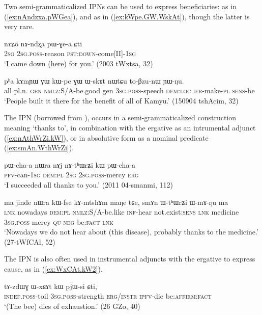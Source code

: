 Two semi-grammaticalized IPNs can be used to express beneficiaries:  as in (\ref{ex:nAndzxa.pWGea}), and  as in (\ref{ex:kWpe.GW.WskAt}), though the latter is very rare.

\begin{exe}
\ex \label{ex:nAndzxa.pWGea}
\gll nɤʑo nɤ-ndʐa pɯ-ɣe-a ɕti \\
\textsc{2sg} \textsc{2sg}.\textsc{poss}-reason \textsc{pst}:\textsc{down}-come[II]-\textsc{1sg} \\
\glt `I came down (here) for you.' (2003 tWxtsa, 32)
\end{exe}

\begin{exe}
\ex \label{ex:kWpe.GW.WskAt}
\gll pʰa kɤmɲɯ ɣɯ kɯ-pe ɣɯ ɯ-skɤt nɯtɕu to-βzu-nɯ ɲɯ-ŋu. \\
all pl.n. \textsc{gen} \textsc{nmlz}:S/A-be.good gen \textsc{3sg}.\textsc{poss}-speech \textsc{dem}:\textsc{loc} \textsc{ifr}-make-\textsc{pl} \textsc{sens}-be \\
\glt `People built it there for the benefit of all of Kamyu.' (150904 tshAcim, 32)
\end{exe}

The IPN  (borrowed from ), occurs in a semi-grammaticalized construction meaning `thanks to', in combination with the ergative  as an intrumental adjunct (\ref{ex:nAthWrZi.kW}), or in absolutive form as a nominal predicate (\ref{ex:smAn.WthWrZi}).

  \begin{exe}
\ex \label{ex:nAthWrZi.kW}
\gll pɯ-cha-a nɯra nɤj nɤ-tʰɯrʑi kɯ pɯ-cha-a \\
\textsc{pfv}-can-\textsc{1sg} \textsc{dem}:\textsc{pl} \textsc{2sg} \textsc{2sg}.\textsc{poss}-mercy \textsc{erg}  \\
\glt `I succeeded all thanks to you.' (2011 04-smanmi, 112)
  \end{exe}

  \begin{exe}
\ex \label{ex:smAn.WthWrZi}
\gll   ma jinde nɯra kɯ-fse kɤ-mtshɤm maŋe tɕe, smɤn ɯ-tʰɯrʑi ɯ-mɤ-ŋu ma \\
\textsc{lnk} nowadays \textsc{dem}:\textsc{pl} \textsc{nmlz}:S/A-be.like \textsc{inf}-hear not.exist:\textsc{sens} \textsc{lnk} medicine   \textsc{3sg}.\textsc{poss}-mercy \textsc{qu}-\textsc{neg}-be:\textsc{fact} \textsc{lnk} \\
\glt `Nowadays we do not hear about (this disease), probably thanks to the medicine.' (27-tWfCAl, 52)
  \end{exe}  
  
The IPN  is also often used in instrumental adjuncts with the ergative to express cause, as in (\ref{ex:WxCAt.kW2}).

  \begin{exe}
\ex \label{ex:WxCAt.kW2}
\gll   tɤ-zdɯɣ ɯ-xɕɤt kɯ pjɯ-si ɕti, \\
  \textsc{indef.poss}-toil  \textsc{3sg.poss}-strength \textsc{erg/instr} \textsc{ipfv}-die be:\textsc{affirm}:\textsc{fact} \\
 \glt `(The bee) dies of exhaustion.' (26 GZo, 40)
  \end{exe}

